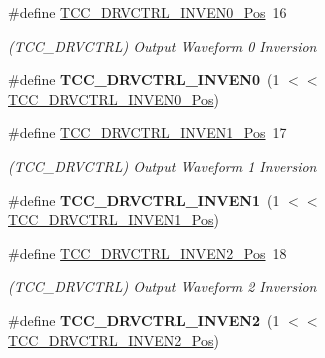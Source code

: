 \begin{DoxyCompactItemize}
\item 
\hypertarget{group___s_a_m_l21___t_c_c_ga1b557d54a00cb159661a7ffc6dcc578e}{}\#define \hyperlink{group___s_a_m_l21___t_c_c_ga1b557d54a00cb159661a7ffc6dcc578e}{T\+C\+C\+\_\+\+D\+R\+V\+C\+T\+R\+L\+\_\+\+I\+N\+V\+E\+N0\+\_\+\+Pos}~16\label{group___s_a_m_l21___t_c_c_ga1b557d54a00cb159661a7ffc6dcc578e}

\begin{DoxyCompactList}\small\item\em (T\+C\+C\+\_\+\+D\+R\+V\+C\+T\+R\+L) Output Waveform 0 Inversion \end{DoxyCompactList}\item 
\hypertarget{group___s_a_m_l21___t_c_c_ga1f95bce76852add66e5201186fa508e9}{}\#define {\bfseries T\+C\+C\+\_\+\+D\+R\+V\+C\+T\+R\+L\+\_\+\+I\+N\+V\+E\+N0}~(1 $<$$<$ \hyperlink{group___s_a_m_l21___t_c_c_ga1b557d54a00cb159661a7ffc6dcc578e}{T\+C\+C\+\_\+\+D\+R\+V\+C\+T\+R\+L\+\_\+\+I\+N\+V\+E\+N0\+\_\+\+Pos})\label{group___s_a_m_l21___t_c_c_ga1f95bce76852add66e5201186fa508e9}

\item 
\hypertarget{group___s_a_m_l21___t_c_c_ga656b723a3fa5621643525fd32b2ec725}{}\#define \hyperlink{group___s_a_m_l21___t_c_c_ga656b723a3fa5621643525fd32b2ec725}{T\+C\+C\+\_\+\+D\+R\+V\+C\+T\+R\+L\+\_\+\+I\+N\+V\+E\+N1\+\_\+\+Pos}~17\label{group___s_a_m_l21___t_c_c_ga656b723a3fa5621643525fd32b2ec725}

\begin{DoxyCompactList}\small\item\em (T\+C\+C\+\_\+\+D\+R\+V\+C\+T\+R\+L) Output Waveform 1 Inversion \end{DoxyCompactList}\item 
\hypertarget{group___s_a_m_l21___t_c_c_ga28e61d198f05e5e3f0de3f8624f6feb2}{}\#define {\bfseries T\+C\+C\+\_\+\+D\+R\+V\+C\+T\+R\+L\+\_\+\+I\+N\+V\+E\+N1}~(1 $<$$<$ \hyperlink{group___s_a_m_l21___t_c_c_ga656b723a3fa5621643525fd32b2ec725}{T\+C\+C\+\_\+\+D\+R\+V\+C\+T\+R\+L\+\_\+\+I\+N\+V\+E\+N1\+\_\+\+Pos})\label{group___s_a_m_l21___t_c_c_ga28e61d198f05e5e3f0de3f8624f6feb2}

\item 
\hypertarget{group___s_a_m_l21___t_c_c_gab906d480e6eb94d970beef2c92fa8245}{}\#define \hyperlink{group___s_a_m_l21___t_c_c_gab906d480e6eb94d970beef2c92fa8245}{T\+C\+C\+\_\+\+D\+R\+V\+C\+T\+R\+L\+\_\+\+I\+N\+V\+E\+N2\+\_\+\+Pos}~18\label{group___s_a_m_l21___t_c_c_gab906d480e6eb94d970beef2c92fa8245}

\begin{DoxyCompactList}\small\item\em (T\+C\+C\+\_\+\+D\+R\+V\+C\+T\+R\+L) Output Waveform 2 Inversion \end{DoxyCompactList}\item 
\hypertarget{group___s_a_m_l21___t_c_c_ga1ef49a13ff88b6f7acb6550b8dae5693}{}\#define {\bfseries T\+C\+C\+\_\+\+D\+R\+V\+C\+T\+R\+L\+\_\+\+I\+N\+V\+E\+N2}~(1 $<$$<$ \hyperlink{group___s_a_m_l21___t_c_c_gab906d480e6eb94d970beef2c92fa8245}{T\+C\+C\+\_\+\+D\+R\+V\+C\+T\+R\+L\+\_\+\+I\+N\+V\+E\+N2\+\_\+\+Pos})\label{group___s_a_m_l21___t_c_c_ga1ef49a13ff88b6f7acb6550b8dae5693}


\end{DoxyCompactItemize}
